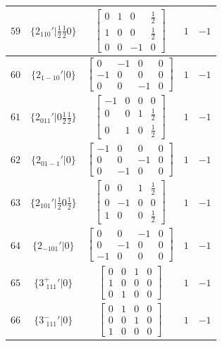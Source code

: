 \documentclass[fleqn,8pt]{jsarticle}
\begin{document}
\begin{longtable}{ccccc}
$ 59 $ & $ \{2{}_{110}{}'|\frac{1}{2} \frac{1}{2} 0\} $ & $ \begin{bmatrix} 0 & 1 & 0 & \frac{1}{2} \\ 1 & 0 & 0 & \frac{1}{2} \\ 0 & 0 & -1 & 0 \end{bmatrix} $ & $ 1 $ & $ -1 $ \\ \hline
$ 60 $ & $ \{2{}_{1-10}{}'|0\} $ & $ \begin{bmatrix} 0 & -1 & 0 & 0 \\ -1 & 0 & 0 & 0 \\ 0 & 0 & -1 & 0 \end{bmatrix} $ & $ 1 $ & $ -1 $ \\ \hline
$ 61 $ & $ \{2{}_{011}{}'|0 \frac{1}{2} \frac{1}{2}\} $ & $ \begin{bmatrix} -1 & 0 & 0 & 0 \\ 0 & 0 & 1 & \frac{1}{2} \\ 0 & 1 & 0 & \frac{1}{2} \end{bmatrix} $ & $ 1 $ & $ -1 $ \\ \hline
$ 62 $ & $ \{2{}_{01-1}{}'|0\} $ & $ \begin{bmatrix} -1 & 0 & 0 & 0 \\ 0 & 0 & -1 & 0 \\ 0 & -1 & 0 & 0 \end{bmatrix} $ & $ 1 $ & $ -1 $ \\ \hline
$ 63 $ & $ \{2{}_{101}{}'|\frac{1}{2} 0 \frac{1}{2}\} $ & $ \begin{bmatrix} 0 & 0 & 1 & \frac{1}{2} \\ 0 & -1 & 0 & 0 \\ 1 & 0 & 0 & \frac{1}{2} \end{bmatrix} $ & $ 1 $ & $ -1 $ \\ \hline
$ 64 $ & $ \{2{}_{-101}{}'|0\} $ & $ \begin{bmatrix} 0 & 0 & -1 & 0 \\ 0 & -1 & 0 & 0 \\ -1 & 0 & 0 & 0 \end{bmatrix} $ & $ 1 $ & $ -1 $ \\ \hline
$ 65 $ & $ \{3^{+}_{\,\,111}{}'|0\} $ & $ \begin{bmatrix} 0 & 0 & 1 & 0 \\ 1 & 0 & 0 & 0 \\ 0 & 1 & 0 & 0 \end{bmatrix} $ & $ 1 $ & $ -1 $ \\ \hline
$ 66 $ & $ \{3^{-}_{\,\,111}{}'|0\} $ & $ \begin{bmatrix} 0 & 1 & 0 & 0 \\ 0 & 0 & 1 & 0 \\ 1 & 0 & 0 & 0 \end{bmatrix} $ & $ 1 $ & $ -1 $ \\ \hline

\end{longtable}
\end{document}
